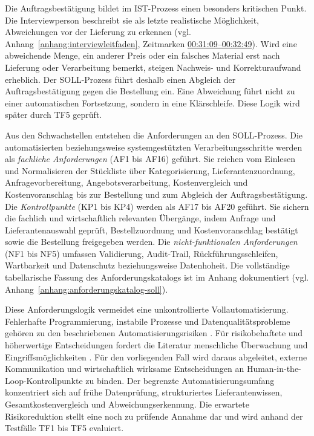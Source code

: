 \documentclass[a4paper,12pt]{article}
\begin{document}
Die Auftragsbestätigung bildet im IST-Prozess einen besonders kritischen Punkt. Die Interviewperson beschreibt sie als letzte realistische Möglichkeit, Abweichungen vor der Lieferung zu erkennen (vgl. Anhang~\ref{anhang:interviewleitfaden}, Zeitmarken \hyperlink{itv:fehlerstellen}{00:31:09--00:32:49}). Wird eine abweichende Menge, ein anderer Preis oder ein falsches Material erst nach Lieferung oder Verarbeitung bemerkt, steigen Nachweis- und Korrekturaufwand erheblich. Der SOLL-Prozess führt deshalb einen Abgleich der Auftragsbestätigung gegen die Bestellung ein. Eine Abweichung führt nicht zu einer automatischen Fortsetzung, sondern in eine Klärschleife. Diese Logik wird später durch TF5 geprüft.

Aus den Schwachstellen entstehen die Anforderungen an den SOLL-Prozess. Die automatisierten beziehungsweise systemgestützten Verarbeitungsschritte werden als \textit{fachliche Anforderungen} (AF1 bis AF16) geführt. Sie reichen vom Einlesen und Normalisieren der Stückliste über Kategorisierung, Lieferantenzuordnung, Anfragevorbereitung, Angebotsverarbeitung, Kostenvergleich und Kostenvoranschlag bis zur Bestellung und zum Abgleich der Auftragsbestätigung. Die \textit{Kontrollpunkte} (KP1 bis KP4) werden als AF17 bis AF20 geführt. Sie sichern die fachlich und wirtschaftlich relevanten Übergänge, indem Anfrage und Lieferantenauswahl geprüft, Bestellzuordnung und Kostenvoranschlag bestätigt sowie die Bestellung freigegeben werden. Die \textit{nicht-funktionalen Anforderungen} (NF1 bis NF5) umfassen Validierung, Audit-Trail, Rückführungsschleifen, Wartbarkeit und Datenschutz beziehungsweise Datenhoheit. Die vollständige tabellarische Fassung des Anforderungskatalogs ist im Anhang dokumentiert (vgl. Anhang~\ref{anhang:anforderungskatalog-soll}).

Diese Anforderungslogik vermeidet eine unkontrollierte Vollautomatisierung. Fehlerhafte Programmierung, instabile Prozesse und Datenqualitätsprobleme gehören zu den beschriebenen Automatisierungsrisiken \parencite{brettschneider_bewertung_2020}. Für risikobehaftete und höherwertige Entscheidungen fordert die Literatur menschliche Überwachung und Eingriffsmöglichkeiten \parencite{ng_systematic_2021}. Für den vorliegenden Fall wird daraus abgeleitet, externe Kommunikation und wirtschaftlich wirksame Entscheidungen an Human-in-the-Loop-Kontrollpunkte zu binden. Der begrenzte Automatisierungsumfang konzentriert sich auf frühe Datenprüfung, strukturiertes Lieferantenwissen, Gesamtkostenvergleich und Abweichungserkennung. Die erwartete Risikoreduktion stellt eine noch zu prüfende Annahme dar und wird anhand der Testfälle TF1 bis TF5 evaluiert.
\end{document}
